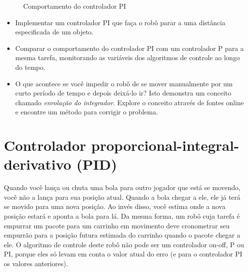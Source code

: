 \begin{figure}
\begin{center}
\caption{Comportamento do controlador PI}\label{fig.pi-control}
\end{center}
\end{figure}

\begin{framed}
\begin{itemize}
\item Implementar um controlador PI que faça o robô parar a uma distância especificada de um objeto.
\item Comparar o comportamento do controlador PI com um controlador P para a mesma tarefa, monitorando as variáveis dos algoritmos de controle ao longo do tempo.
\item O que acontece se você impedir o robô de se mover manualmente por um curto período de tempo e depois deixá-lo ir? Isto demonstra um conceito chamado \emph{enrolação do integrador}. Explore o conceito através de fontes online e encontre um método para corrigir o problema.
\end{itemize}
\end{framed}

\section{Controlador proporcional-integral-derivativo (PID)}\label{s.pid}

Quando você lança ou chuta uma bola para outro jogador que está se movendo, você não a lança para sua posição atual. Quando a bola chegar a ele, ele já terá se movido para uma nova posição. Ao invés disso, você estima onde a nova posição estará e aponta a bola para lá. Da mesma forma, um robô cuja tarefa é empurrar um pacote para um carrinho em movimento deve cronometrar seu empurrão para a posição futura estimada do carrinho quando o pacote chegar a ele. O algoritmo de controle deste robô não pode ser um controlador on-off, P ou PI, porque eles só levam em conta o valor atual do erro (e para o controlador PI os valores anteriores). 

